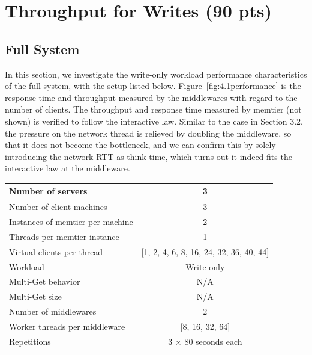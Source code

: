 \section{Throughput for Writes (90 pts)}

\subsection{Full System}

In this section, we investigate the write-only workload performance characteristics of the full system, with the setup listed below. Figure~\ref{fig:4.1performance} is the response time and throughput measured by the middlewares with regard to the number of clients. The throughput and response time measured by memtier (not shown) is verified to follow the interactive law. Similar to the case in Section 3.2, the pressure on the network thread is relieved by doubling the middleware, so that it does not become the bottleneck, and we can confirm this by solely introducing the network RTT as think time, which turns out it indeed fits the interactive law at the middleware.


\begin{center}
	\scriptsize{
		\begin{tabular}{|l|c|}
			\hline Number of servers                & 3          \\ 
			\hline Number of client machines        & 3          \\ 
			\hline Instances of memtier per machine & 2          \\ 
			\hline Threads per memtier instance     & 1          \\
			\hline Virtual clients per thread       & [1, 2, 4, 6, 8, 16, 24, 32, 36, 40, 44]    \\ 
			\hline Workload                         & Write-only \\
			\hline Multi-Get behavior               & N/A        \\
			\hline Multi-Get size                   & N/A        \\
			\hline Number of middlewares            & 2          \\
			\hline Worker threads per middleware    & [8, 16, 32, 64]    \\
			\hline Repetitions                      & 3 $\times$ 80 seconds each  \\ 
			\hline 
		\end{tabular}
	} 
\end{center}

